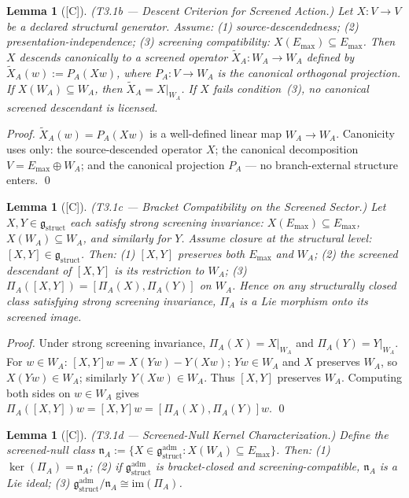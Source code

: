 \documentclass[12pt,oneside]{amsbook}
\theoremstyle{plain}
\newtheorem{lemma}[theorem]{Lemma}
\theoremstyle{definition}
\theoremstyle{remark}
\newcommand{\status}[1]{\textup{[#1]}}
\begin{document}
\begin{lemma}[\status{C}]\label{lem:T3-1b}
\textup{(T3.1b --- Descent Criterion for Screened Action.)}
Let $X : V \to V$ be a declared structural generator. Assume:
\textup{(1)} source-descendedness; \textup{(2)} presentation-independence;
\textup{(3)} screening compatibility: $X(E_{\max}) \subseteq E_{\max}$.
Then $X$ descends canonically to a screened operator
$\widetilde{X}_A : W_A \to W_A$ defined by
$\widetilde{X}_A(w) := P_A(Xw)$,
where $P_A : V \to W_A$ is the canonical orthogonal projection.
If $X(W_A) \subseteq W_A$, then $\widetilde{X}_A = X|_{W_A}$.
If $X$ fails condition~\textup{(3)}, no canonical screened descendant is
licensed.
\end{lemma}

\begin{proof}
$\widetilde{X}_A(w) = P_A(Xw)$ is a well-defined linear map $W_A \to W_A$.
Canonicity uses only: the source-descended operator $X$; the canonical
decomposition $V = E_{\max} \oplus W_A$; and the canonical projection
$P_A$ --- no branch-external structure enters. \qed
\end{proof}

\begin{lemma}[\status{C}]\label{lem:T3-1c}
\textup{(T3.1c --- Bracket Compatibility on the Screened Sector.)}
Let $X, Y \in \mathfrak{g}_{\mathrm{struct}}$ each satisfy strong
screening invariance: $X(E_{\max}) \subseteq E_{\max}$,
$X(W_A) \subseteq W_A$, and similarly for $Y$.
Assume closure at the structural level: $[X,Y] \in \mathfrak{g}_{\mathrm{struct}}$.
Then: \textup{(1)} $[X,Y]$ preserves both $E_{\max}$ and $W_A$;
\textup{(2)} the screened descendant of $[X,Y]$ is its restriction to $W_A$;
\textup{(3)} $\Pi_A([X,Y]) = [\Pi_A(X), \Pi_A(Y)]$ on $W_A$.
Hence on any structurally closed class satisfying strong screening invariance,
$\Pi_A$ is a Lie morphism onto its screened image.
\end{lemma}

\begin{proof}
Under strong screening invariance, $\Pi_A(X) = X|_{W_A}$ and
$\Pi_A(Y) = Y|_{W_A}$. For $w \in W_A$: $[X,Y]w = X(Yw) - Y(Xw)$;
$Yw \in W_A$ and $X$ preserves $W_A$, so $X(Yw) \in W_A$; similarly
$Y(Xw) \in W_A$. Thus $[X,Y]$ preserves $W_A$. Computing both sides
on $w \in W_A$ gives $\Pi_A([X,Y])w = [X,Y]w = [\Pi_A(X),\Pi_A(Y)]w$. \qed
\end{proof}

\begin{lemma}[\status{C}]\label{lem:T3-1d}
\textup{(T3.1d --- Screened-Null Kernel Characterization.)}
Define the screened-null class
$\mathfrak{n}_A := \{X \in \mathfrak{g}_{\mathrm{struct}}^{\mathrm{adm}} :
X(W_A) \subseteq E_{\max}\}$.
Then: \textup{(1)} $\ker(\Pi_A) = \mathfrak{n}_A$;
\textup{(2)} if $\mathfrak{g}_{\mathrm{struct}}^{\mathrm{adm}}$ is
bracket-closed and screening-compatible, $\mathfrak{n}_A$ is a Lie ideal;
\textup{(3)} $\mathfrak{g}_{\mathrm{struct}}^{\mathrm{adm}}/\mathfrak{n}_A
\cong \mathrm{im}(\Pi_A)$.
\end{lemma}
\end{document}
